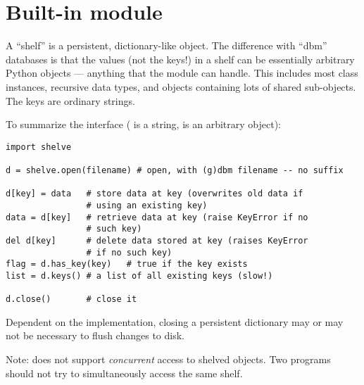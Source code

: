 \section{Built-in module }

A ``shelf'' is a persistent, dictionary-like object.  The difference
with ``dbm'' databases is that the values (not the keys!) in a shelf
can be essentially arbitrary Python objects --- anything that the
 module can handle.  This includes most class instances,
recursive data types, and objects containing lots of shared
sub-objects.  The keys are ordinary strings.

To summarize the interface ( is a string,  is an
arbitrary object):

\begin{verbatim}
import shelve

d = shelve.open(filename) # open, with (g)dbm filename -- no suffix

d[key] = data   # store data at key (overwrites old data if
                # using an existing key)
data = d[key]   # retrieve data at key (raise KeyError if no
                # such key)
del d[key]      # delete data stored at key (raises KeyError
                # if no such key)
flag = d.has_key(key)   # true if the key exists
list = d.keys() # a list of all existing keys (slow!)

d.close()       # close it
\end{verbatim}

Dependent on the implementation, closing a persistent dictionary may
or may not be necessary to flush changes to disk.

Note:  does not support {\em concurrent} access to
shelved objects.  Two programs should not try to simultaneously access
the same shelf.
